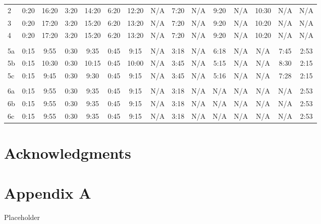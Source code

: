 \documentclass[12pt,oneside]{book}
\begin{document}
\begin{landscape}
\begin{table}[!ht]
\begin{tabular}{lcccccccccccccc}
\\
\midrule
2 & 0:20 & 16:20 & 3:20 & 14:20 & 6:20 & 12:20 & 
N/A & 7:20 & N/A & 9:20 & N/A & 10:30 & N/A & N/A \\
3 & 0:20 & 17:20 & 3:20 & 15:20 & 6:20 & 13:20 & 
N/A & 7:20 & N/A & 9:20 & N/A & 10:20 & N/A & N/A \\
4 & 0:20 & 17:20 & 3:20 & 15:20 & 6:20 & 13:20 & 
N/A & 7:20 & N/A & 9:20 & N/A & 10:20 & N/A & N/A 
\\ \multicolumn{15}{c}{ } \\
5a & 0:15 & 9:55 & 0:30 & 9:35 & 0:45 & 9:15 & 
N/A & 3:18 & N/A & 6:18 & N/A & N/A & 7:45 & 2:53 \\
5b & 0:15 & 10:30 & 0:30 & 10:15 & 0:45 & 10:00 & 
N/A & 3:45 & N/A & 5:15 & N/A & N/A & 8:30 & 2:15 \\
5c & 0:15 & 9:45 & 0:30 & 9:30 & 0:45 & 9:15 & 
N/A & 3:45 & N/A & 5:16 & N/A & N/A & 7:28 & 2:15
\\ \multicolumn{15}{c}{ } \\
6a & 0:15 & 9:55 & 0:30 & 9:35 & 0:45 & 9:15 & 
N/A & 3:18 & N/A & N/A & N/A & N/A & N/A & 2:53 \\
6b & 0:15 & 9:55 & 0:30 & 9:35 & 0:45 & 9:15 & 
N/A & 3:18 & N/A & N/A & N/A & N/A & N/A & 2:53 \\
6c & 0:15 & 9:55 & 0:30 & 9:35 & 0:45 & 9:15 & 
N/A & 3:18 & N/A & N/A & N/A & N/A & N/A & 2:53 \\
\bottomrule
\end{tabular}
\label{table:east_exp_times}
\end{table}
\end{landscape}

\chapter{Acknowledgments}
\label{chap:Acknowledgments}



\appendix

\chapter{Appendix A}

Placeholder
\end{document}
